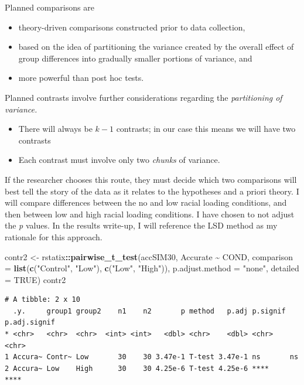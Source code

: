 \documentclass[
  11pt,
]{book}
\newenvironment{Shaded}{\begin{snugshade}}{\end{snugshade}}
\newcommand{\AttributeTok}[1]{\textcolor[rgb]{0.27,0.27,0.27}{#1}}
\newcommand{\ConstantTok}[1]{\textcolor[rgb]{0.37,0.37,0.37}{#1}}
\newcommand{\FunctionTok}[1]{\textcolor[rgb]{0.27,0.27,0.27}{\textbf{#1}}}
\newcommand{\NormalTok}[1]{#1}
\newcommand{\OtherTok}[1]{\textcolor[rgb]{0.37,0.37,0.37}{#1}}
\newcommand{\SpecialCharTok}[1]{\textcolor[rgb]{0.43,0.43,0.43}{\textbf{#1}}}
\newcommand{\StringTok}[1]{\textcolor[rgb]{0.5,0.5,0.5}{#1}}
\providecommand{\tightlist}{%
  \setlength{\itemsep}{0pt}\setlength{\parskip}{0pt}}
\begin{document}
Planned comparisons are

\begin{itemize}
\tightlist
\item
  theory-driven comparisons constructed prior to data collection,
\item
  based on the idea of partitioning the variance created by the overall effect of group differences into gradually smaller portions of variance, and
\item
  more powerful than post hoc tests.
\end{itemize}

Planned contrasts involve further considerations regarding the \emph{partitioning of variance.}

\begin{itemize}
\tightlist
\item
  There will always be \(k-1\) contrasts; in our case this means we will have two contrasts
\item
  Each contrast must involve only two \emph{chunks} of variance.
\end{itemize}

If the researcher chooses this route, they must decide which two comparisons will best tell the story of the data as it relates to the hypotheses and a priori theory. I will compare differences between the no and low racial loading conditions, and then between low and high racial loading conditions. I have chosen to not adjust the \emph{p} values. In the results write-up, I will reference the LSD method as my rationale for this approach.

\begin{Shaded}
\begin{Highlighting}[]
\NormalTok{contr2 }\OtherTok{\textless{}{-}}\NormalTok{ rstatix}\SpecialCharTok{::}\FunctionTok{pairwise\_t\_test}\NormalTok{(accSIM30, Accurate }\SpecialCharTok{\textasciitilde{}}\NormalTok{ COND, }\AttributeTok{comparison =} \FunctionTok{list}\NormalTok{(}\FunctionTok{c}\NormalTok{(}\StringTok{"Control"}\NormalTok{,}
    \StringTok{"Low"}\NormalTok{), }\FunctionTok{c}\NormalTok{(}\StringTok{"Low"}\NormalTok{, }\StringTok{"High"}\NormalTok{)), }\AttributeTok{p.adjust.method =} \StringTok{"none"}\NormalTok{, }\AttributeTok{detailed =} \ConstantTok{TRUE}\NormalTok{)}
\NormalTok{contr2}
\end{Highlighting}
\end{Shaded}

\begin{verbatim}
# A tibble: 2 x 10
  .y.     group1 group2    n1    n2       p method   p.adj p.signif p.adj.signif
* <chr>   <chr>  <chr>  <int> <int>   <dbl> <chr>    <dbl> <chr>    <chr>       
1 Accura~ Contr~ Low       30    30 3.47e-1 T-test 3.47e-1 ns       ns          
2 Accura~ Low    High      30    30 4.25e-6 T-test 4.25e-6 ****     ****        
\end{verbatim}
\end{document}
